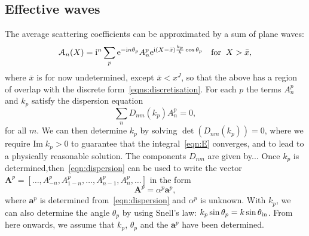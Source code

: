 \documentclass[12pt, a4paper]{article}
\begin{document}
\subsection{Effective waves}
The average scattering coefficients can be approximated by a sum of plane waves:
\begin{equation}
  \mathcal A_n(X) = \textrm{i}^n \sum_p \textrm{e}^{-\textrm{i} n \theta_p} A_{n}^p \textrm{e}^{\textrm{i} (X -\bar x) \frac{k_p}{k} \cos \theta_p } \quad \text{for} \;\; X > \bar x ,
\label{eqn:effective_waves}
\end{equation}
where $\bar x$ is for now undetermined, except $\bar x < x^J$, so that the above has a region of overlap with the discrete form~\eqref{eqns:discretisation}. For each $p$ the terms $A^p_n$ and $k_p$ satisfy the dispersion equation
\begin{equation}
  \sum_n D_{nm}(k_p) A^p_n =0,
  \label{eqn:dispersion}
\end{equation}
for all $m$. We can then determine $k_p$ by solving $\det (D_{nm}(k_p)) =0$, where we require
$\text{Im} \;  k_p > 0$ to guarantee that the integral~\eqref{eqn:E} converges, and to lead to a physically reasonable solution. The components $D_{nm}$ are given by... Once $k_p$ is determined,then~\eqref{eqn:dispersion} can be used to write the vector $ \mathbf A^p = [\ldots, A^p_{-n}, A^p_{1-n}, \ldots, A^p_{n-1}, A^p_{n}, \ldots]$ in the form
\begin{equation}
  \mathbf A^p = \alpha^p \mathbf a^p,
  \label{eqn:A_eigenvector}
\end{equation}
 where $\mathbf a^p$ is determined from~\eqref{eqn:dispersion} and $\alpha^p$ is unknown. With $k_p$, we can also determine the angle $\theta_p$ by using Snell's law: $k_p \sin \theta_p = k \sin \theta_{\mathrm{in}}$. From here onwards, we assume that $k_p$, $\theta_p$ and the $\mathbf a^p$ have been determined.
\end{document}
